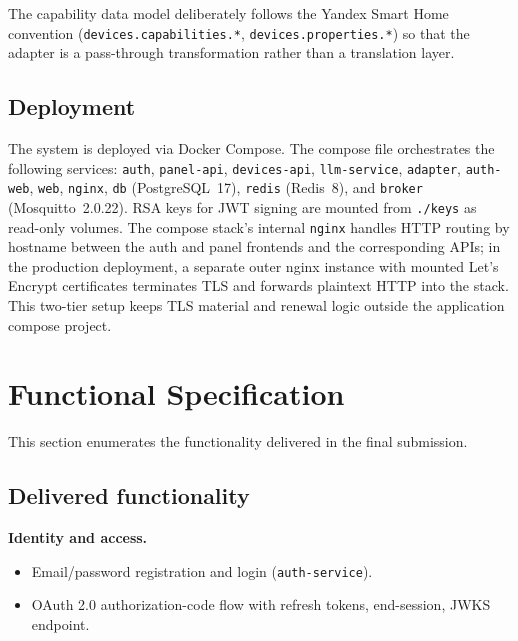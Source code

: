 \documentclass[a4paper,12pt]{article}
\begin{document}
The capability data model deliberately follows the Yandex Smart Home convention (\verb|devices.capabilities.*|, \verb|devices.properties.*|) so that the adapter is a pass-through transformation rather than a translation layer.

\subsection{Deployment}

The system is deployed via Docker Compose. The compose file orchestrates the following services: \verb|auth|, \verb|panel-api|, \verb|devices-api|, \verb|llm-service|, \verb|adapter|, \verb|auth-web|, \verb|web|, \verb|nginx|, \verb|db| (PostgreSQL~17), \verb|redis| (Redis~8), and \verb|broker| (Mosquitto~2.0.22). RSA keys for JWT signing are mounted from \verb|./keys| as read-only volumes. The compose stack's internal \verb|nginx| handles HTTP routing by hostname between the auth and panel frontends and the corresponding APIs; in the production deployment, a separate outer nginx instance with mounted Let's Encrypt certificates terminates TLS and forwards plaintext HTTP into the stack. This two-tier setup keeps TLS material and renewal logic outside the application compose project.

\newpage

\section{Functional Specification}
\label{sec:func}

This section enumerates the functionality delivered in the final submission.

\subsection{Delivered functionality}

\noindent\textbf{Identity and access.}
\begin{itemize}
  \item Email/password registration and login (\verb|auth-service|).
  \item OAuth 2.0 authorization-code flow with refresh tokens, end-session, JWKS endpoint.
\end{itemize}
\end{document}

